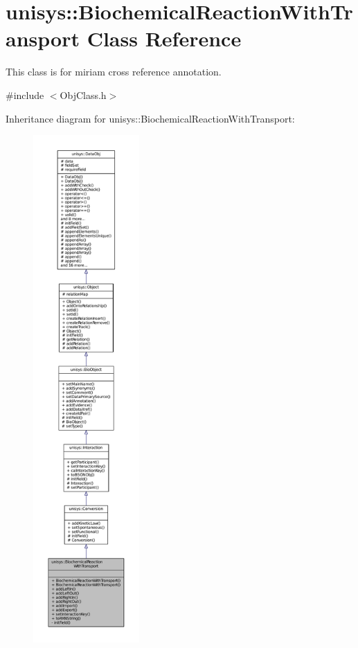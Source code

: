 \hypertarget{classunisys_1_1BiochemicalReactionWithTransport}{\section{unisys\-:\-:Biochemical\-Reaction\-With\-Transport Class Reference}
\label{classunisys_1_1BiochemicalReactionWithTransport}
}


This class is for miriam cross reference annotation.  




{\ttfamily \#include $<$Obj\-Class.\-h$>$}



Inheritance diagram for unisys\-:\-:Biochemical\-Reaction\-With\-Transport\-:
\nopagebreak
\begin{figure}[H]
\begin{center}
\leavevmode
\includegraphics[height=550pt]{classunisys_1_1BiochemicalReactionWithTransport__inherit__graph}
\end{center}
\end{figure}


